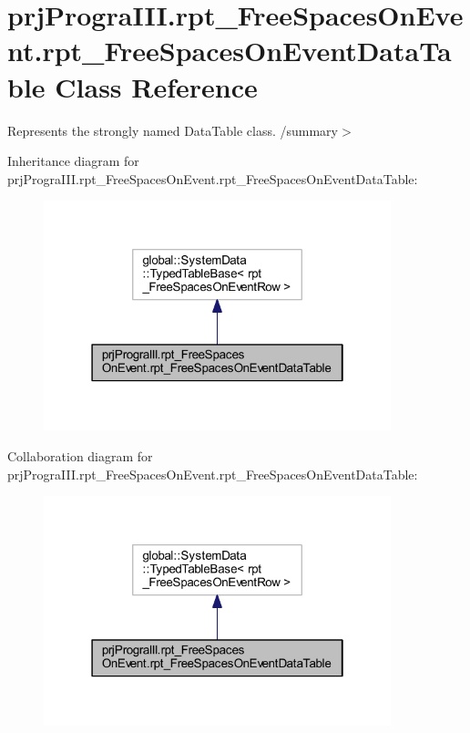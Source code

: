 \hypertarget{classprj_progra_i_i_i_1_1rpt___free_spaces_on_event_1_1rpt___free_spaces_on_event_data_table}{}\section{prj\+Progra\+I\+I\+I.\+rpt\+\_\+\+Free\+Spaces\+On\+Event.\+rpt\+\_\+\+Free\+Spaces\+On\+Event\+Data\+Table Class Reference}
\label{classprj_progra_i_i_i_1_1rpt___free_spaces_on_event_1_1rpt___free_spaces_on_event_data_table}


Represents the strongly named Data\+Table class. /summary$>$  




Inheritance diagram for prj\+Progra\+I\+I\+I.\+rpt\+\_\+\+Free\+Spaces\+On\+Event.\+rpt\+\_\+\+Free\+Spaces\+On\+Event\+Data\+Table\+:
\nopagebreak
\begin{figure}[H]
\begin{center}
\leavevmode
\includegraphics[width=286pt]{classprj_progra_i_i_i_1_1rpt___free_spaces_on_event_1_1rpt___free_spaces_on_event_data_table__inherit__graph}
\end{center}
\end{figure}


Collaboration diagram for prj\+Progra\+I\+I\+I.\+rpt\+\_\+\+Free\+Spaces\+On\+Event.\+rpt\+\_\+\+Free\+Spaces\+On\+Event\+Data\+Table\+:
\nopagebreak
\begin{figure}[H]
\begin{center}
\leavevmode
\includegraphics[width=286pt]{classprj_progra_i_i_i_1_1rpt___free_spaces_on_event_1_1rpt___free_spaces_on_event_data_table__coll__graph}
\end{center}
\end{figure}
